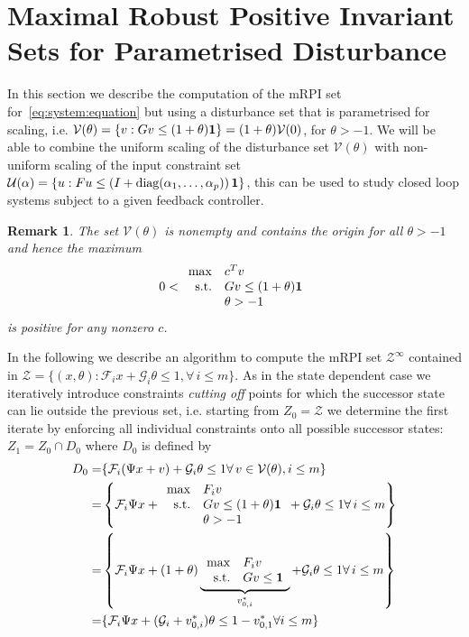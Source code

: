 \documentclass[letterpaper, 10pt, conference]{ieeeconf} %
\newtheorem{rem}[thm]{Remark}
\begin{document}
\section{Maximal Robust Positive Invariant Sets for Parametrised Disturbance}\label{sec:mRPI:parametrised}
%
%
In this section we describe the computation of the mRPI set for~\eqref{eq:system:equation}
but using a disturbance set that is parametrised for scaling, i.e. $\mathcal V(\theta) = \{v: Gv\leq(1+\theta){\bf{1}}\} 
= (1+\theta)\mathcal V(0)$, for $\theta>-1$. We will be able to combine the uniform scaling of 
the disturbance set $\mathcal V(\theta)$ with non-uniform scaling of the input constraint set
$\mathcal U({\bf{\alpha}}) = \{u: Fu\leq\left(I+\text{diag}(\alpha_1,\dots,\alpha_p)\right){\bf{1}}\}$, 
this can be used to study closed loop systems subject to a given feedback controller.
%
\begin{rem}
The set $\mathcal V(\theta)$ is nonempty and contains the origin for all $\theta>-1$ and hence the 
maximum
%
\[
0<\begin{array}{rl}
\max & c^T v\\
\text{s.t.}& Gv \leq (1+\theta){\bf{1}}\\
&\theta>-1
\end{array}
\]
%
is positive for any nonzero $c$.
\end{rem}
%
In the following we describe an algorithm to compute the mRPI set $\mathcal Z^\infty$ contained in 
$\mathcal Z = \{(x,\theta):\mathcal F_i x+\mathcal G_i\theta \leq 1,\forall\, i\leq m\}$.
As in the state dependent case we iteratively introduce constraints \emph{cutting off} points
for which the successor state can lie outside the previous set, i.e. starting from $Z_0 = \mathcal Z$
we determine the first iterate by enforcing all individual constraints onto all possible successor states:
$Z_1=Z_0\cap D_0$ where $D_0$ is defined by
%
\begin{equation}\small
\begin{split}
	D_0 =& \{\mathcal F_i(\Psi x+v) + \mathcal G_i\theta \leq 1 \forall\, v\in\mathcal V(\theta), i\leq m\}\\
	=&\left\{\mathcal F_i\Psi x + \begin{array}{rl}\max& F_i v \\ \text{s.t.}& Gv \leq 
	(1+\theta){\bf{1}} \\ &\theta>-1\end{array}
	 + \mathcal G_i \theta \leq 1 \forall\, i\leq m\right\}\\
	=&\left\{\mathcal F_i\Psi x + (1+\theta)\underbrace{\begin{array}{rl}\max& F_i v \\ 
	\text{s.t.}& Gv \leq {\bf{1}}\end{array}}_{v_{0,i}^\ast}
	 + \mathcal G_i \theta \leq 1 \forall\, i\leq m\right\}\\
	=&\{\mathcal F_i\Psi x + (\mathcal G_i + v_{0,i}^\ast)\theta \leq 1 - v_{0,1}^\ast \forall i\leq m
	\}
\end{split}\end{equation}
\end{document}
